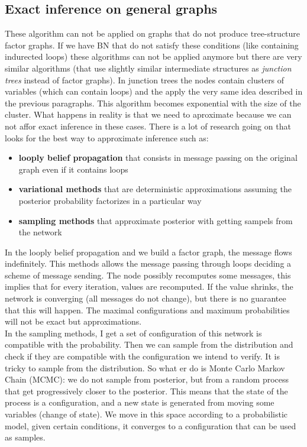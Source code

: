     \subsection{Exact inference on general graphs}
        These algorithm can not be applied on graphs that do not produce tree-structure factor graphs. If we have BN that do not satisfy these conditions (like containing indurected loops) these algorithms can not be applied anymore but there are very similar algorithms (that use slightly similar intermediate structures as \textit{junction trees} instead of factor graphs). 
        In junction trees the nodes contain clusters of variables (which can contain loops) and the apply the very same idea described in the previous paragraphs. This algorithm becomes exponential with the size of the cluster. 
        What happens in reality is that we need to aproximate because we can not affor exact inference in these cases. There is a lot of research going on that looks for the best way to approximate inference such as:
        \begin{itemize}
            \item \textbf{looply belief propagation} that consists in message passing on the original graph even if it contains loops
            \item \textbf{variational methods} that are deterministic approximations assuming the posterior probability factorizes in a particular way
            \item \textbf{sampling methods} that approximate posterior with getting sampels from the network
        \end{itemize}
        In the looply belief propagation and we build a factor graph, the message flows indefinitely. This methods allows the message passing through loops deciding a scheme of message sending. The node possibly recomputes some messages, this implies that for every iteration, values are recomputed. 
        If the value shrinks, the network is converging (all messages do not change), but there is no guarantee that this will happen. The maximal configurations and maximum probabilities will not be exact but approximations. \\
        
        In the sampling methods, I get a set of configuration of this network is compatible with the probability. Then we can sample from the distribution and check if they are compatible with the configuration we intend to verify. It is tricky to sample from the distribution.
        So what er do is Monte Carlo Markov Chain (MCMC): we do not sample from posterior, but from a random process that get progressively closer to the posterior. This means that the state of the process is a configuration, and a new state is generated from moving some variables (change of state). 
        We move in this space according to a probabilistic model, given certain conditions, it converges to a configuration that can be used as samples.
        